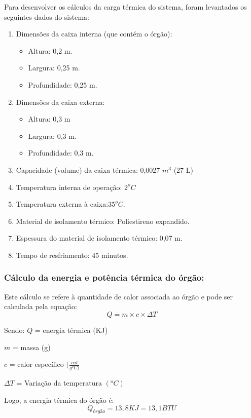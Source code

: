 		Para desenvolver os cálculos da carga térmica do sistema, foram levantados os seguintes dados do sistema:
		\begin{enumerate}
			\item Dimensões da caixa interna (que contém o órgão):
				\begin{itemize}
					\item Altura: 0,2 m.
					\item Largura: 0,25 m.
					\item Profundidade: 0,25 m.
				\end{itemize}
			\item Dimensões da caixa externa:
				\begin{itemize}
					\item Altura: 0,3 m
					\item Largura: 0,3 m.
					\item Profundidade: 0,3 m.
				\end{itemize}
			\item Capacidade (volume) da caixa térmica: 0,0027 $m^3$ (27 L)
			\item Temperatura interna de operação: $2^oC$
			\item Temperatura externa à caixa:$ 35^oC$.
			\item Material de isolamento térmico: Poliestireno expandido.
			\item Espessura do material de isolamento térmico: 0,07 m.
			\item Tempo de resfriamento: 45 minutos.
		\end{enumerate}
		
		\subsubsection{Cálculo da energia e potência térmica do órgão:}
		Este cálculo se refere à quantidade de calor associada ao órgão e pode ser calculada pela equação:
		\begin{equation}
		Q = m \times c \times \Delta T
		\end{equation}
		
		Sendo: 
		$Q$ = energia térmica (KJ)
		
		$m$ = massa (g)
		
		$c$ = calor específico $(\frac{cal}{g^oC)}$
		
		$\Delta T$ = Variação da temperatura $(^oC)$
		
	Logo, a energia térmica do órgão é:
	$$
	Q_{órgão} = 13,8 KJ = 13,1 BTU
	$$	
	
